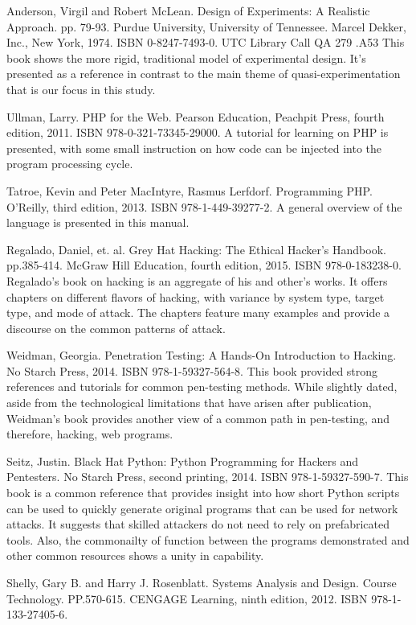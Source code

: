 Anderson, Virgil and Robert McLean. Design of Experiments: A Realistic Approach. pp. 79-93. Purdue University, University of Tennessee. Marcel Dekker, Inc., New York, 1974. ISBN 0-8247-7493-0. UTC Library Call QA 279 .A53 This book shows the more rigid, traditional model of experimental design. It's presented as a reference in contrast to the main theme of quasi-experimentation that is our focus in this study.

Ullman, Larry. PHP for the Web. Pearson Education, Peachpit Press, fourth edition, 2011. ISBN 978-0-321-73345-29000. A tutorial for learning on PHP is presented, with some small instruction on how code can be injected into the program processing cycle.

Tatroe, Kevin and Peter MacIntyre, Rasmus Lerfdorf. Programming PHP. O'Reilly, third edition, 2013. ISBN 978-1-449-39277-2. A general overview of the language is presented in this manual.

Regalado, Daniel, et. al. Grey Hat Hacking: The Ethical Hacker's Handbook. pp.385-414. McGraw Hill Education, fourth edition, 2015. ISBN 978-0-183238-0. Regalado's book on hacking is an aggregate of his and other's works. It offers chapters on different flavors of hacking, with variance by system type, target type, and mode of \gls{attack}. The chapters feature many examples and provide a discourse on the common patterns of \gls{attack}.

Weidman, Georgia. Penetration Testing: A Hands-On Introduction to Hacking. No Starch Press, 2014. ISBN 978-1-59327-564-8. This book provided strong references and tutorials for common pen-testing methods. While slightly dated, aside from the technological limitations that have arisen after publication, Weidman's book provides another view of a common path in pen-testing, and therefore, hacking, web programs.

Seitz, Justin. Black Hat Python: Python Programming for Hackers and Pentesters. No Starch Press, second printing, 2014. ISBN 978-1-59327-590-7. This book is a common reference that provides insight into how short Python scripts can be used to quickly generate original programs that can be used for network attacks. It suggests that skilled attackers do not need to rely on prefabricated tools. Also, the commonailty of function between the programs demonstrated and other common resources shows a unity in capability.

Shelly, Gary B. and Harry J. Rosenblatt. Systems Analysis and Design. Course Technology. PP.570-615. CENGAGE Learning, ninth edition, 2012. ISBN 978-1-133-27405-6.

